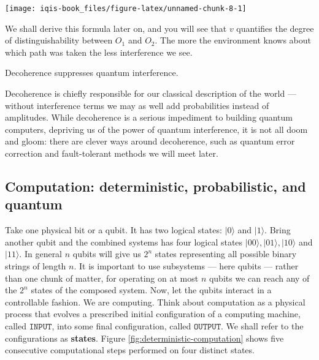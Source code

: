 \documentclass[fleqn]{article}
\newenvironment{idea}{\noindent}{\medskip}
\begin{document}
\begin{center}\texttt{[image: iqis-book\_files/figure-latex/unnamed-chunk-8-1]} \end{center}

We shall derive this formula later on, and you will see that \(v\) quantifies the degree of distinguishability between \(O_1\) and \(O_2\).
The more the environment knows about which path was taken the less interference we see.

\begin{idea}
Decoherence suppresses quantum interference.

\end{idea}

Decoherence is chiefly responsible for our classical description of the world --- without interference terms we may as well add probabilities instead of amplitudes.
While decoherence is a serious impediment to building quantum computers, depriving us of the power of quantum interference, it is not all doom and gloom: there are clever ways around decoherence, such as quantum error correction and fault-tolerant methods we will meet later.

\hypertarget{computation-deterministic-probabilistic-and-quantum}{%
\subsection{Computation: deterministic, probabilistic, and quantum}\label{computation-deterministic-probabilistic-and-quantum}}

Take one physical bit or a qubit.
It has two logical states: \(|0\rangle\) and \(|1\rangle\).
Bring another qubit and the combined systems has four logical states \(|00\rangle, |01\rangle,|10\rangle\) and \(|11\rangle\).
In general \(n\) qubits will give us \(2^n\) states representing all possible binary strings of length \(n\).
It is important to use subsystems --- here qubits --- rather than one chunk of matter, for operating on at most \(n\) qubits we can reach any of the \(2^n\) states of the composed system.
Now, let the qubits interact in a controllable fashion.
We are computing.
Think about computation as a physical process that evolves a prescribed initial configuration of a computing machine, called \textbf{\(\texttt{INPUT}\)}, into some final configuration, called \textbf{\(\texttt{OUTPUT}\)}.
We shall refer to the configurations as \textbf{states}.
Figure \ref{fig:deterministic-computation} shows five consecutive computational steps performed on four distinct states.
\end{document}
